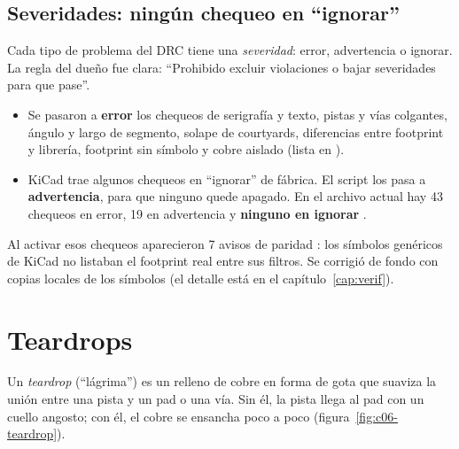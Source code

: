 \subsection{Severidades: ningún chequeo en ``ignorar''}

Cada tipo de problema del DRC tiene una \emph{severidad}: error, advertencia o ignorar. La regla del dueño fue
clara: ``Prohibido excluir violaciones o bajar severidades para que pase''.

\begin{itemize}
  \item Se pasaron a \textbf{error} los chequeos de serigrafía y texto, pistas y vías colgantes, ángulo y largo de
        segmento, solape de courtyards, diferencias entre footprint y librería, footprint sin símbolo y cobre
        aislado (lista  en ).
  \item KiCad trae algunos chequeos en ``ignorar'' de fábrica. El script los pasa a \textbf{advertencia}, para que
        ninguno quede apagado. En el archivo actual hay 43 chequeos en error, 19 en advertencia y \textbf{ninguno en
        ignorar} \medido.
\end{itemize}

Al activar esos chequeos aparecieron 7 avisos de paridad : los símbolos genéricos de
KiCad no listaban el footprint real entre sus filtros. Se corrigió de fondo con copias locales de los símbolos (el
detalle está en el capítulo~\ref{cap:verif}).

\section{Teardrops}\label{sec:c06-teardrops}

Un \emph{teardrop} (``lágrima'') es un relleno de cobre en forma de gota que suaviza la unión entre una pista y un
pad o una vía. Sin él, la pista llega al pad con un cuello angosto; con él, el cobre se ensancha poco a poco
(figura~\ref{fig:c06-teardrop}).


